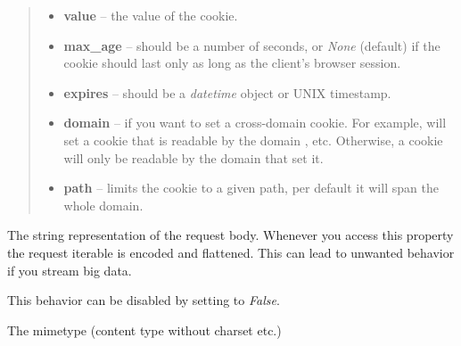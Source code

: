 \documentclass[a4paper,12pt]{sphinxmanual}
\begin{document}
\begin{fulllineitems}
\begin{fulllineitems}
\begin{quote}
\begin{description}
\begin{itemize}
\item {} 
\textbf{value} -- the value of the cookie.

\item {} 
\textbf{max\_age} -- should be a number of seconds, or \emph{None} (default) if
the cookie should last only as long as the client's
browser session.

\item {} 
\textbf{expires} -- should be a \emph{datetime} object or UNIX timestamp.

\item {} 
\textbf{domain} -- if you want to set a cross-domain cookie.  For example,
 will set a cookie that is
readable by the domain ,
 etc.  Otherwise, a cookie will only
be readable by the domain that set it.

\item {} 
\textbf{path} -- limits the cookie to a given path, per default it will
span the whole domain.

\end{itemize}

\end{description}\end{quote}

\end{fulllineitems}


\begin{fulllineitems}
\label{api:flask.Response.data}
The string representation of the request body.  Whenever you access
this property the request iterable is encoded and flattened.  This
can lead to unwanted behavior if you stream big data.

This behavior can be disabled by setting
 to \emph{False}.

\end{fulllineitems}


\begin{fulllineitems}
\label{api:flask.Response.mimetype}
The mimetype (content type without charset etc.)

\end{fulllineitems}


\end{fulllineitems}
\end{document}
